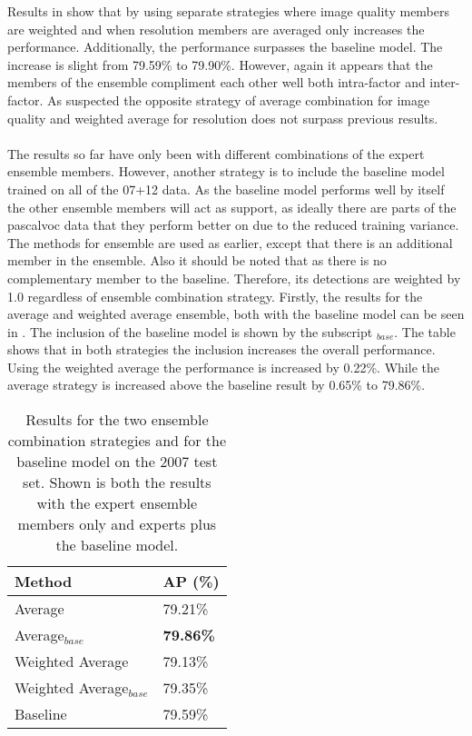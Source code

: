 \documentclass[a4paper,twoside]{article}
\begin{document}
Results in  show that by using separate strategies where image quality members are weighted and when resolution members are averaged only increases the performance. Additionally, the performance surpasses the baseline model. The increase is slight from 79.59\% to 79.90\%. However, again it appears that the members of the ensemble compliment each other well both intra-factor and inter-factor. As suspected the opposite strategy of average combination for image quality and weighted average for resolution does not surpass previous results. 
\\\\
The results so far have only been with different combinations of the expert ensemble members. However, another strategy is to include the baseline model trained on all of the 07+12 data. As the baseline model performs well by itself the other ensemble members will act as support, as ideally there are parts of the \gls{pascalvoc} data that they perform better on due to the reduced training variance. The methods for ensemble are used as earlier, except that there is an additional member in the ensemble. Also it should be noted that as there is no complementary member to the baseline. Therefore, its detections are weighted by 1.0 regardless of ensemble combination strategy. Firstly, the results for the average and weighted average ensemble, both with the baseline model can be seen in . The inclusion of the baseline model is shown by the subscript $_{base}$. The table shows that in both strategies the inclusion increases the overall performance. Using the weighted average the performance is increased by 0.22\%. While the average strategy is increased above the baseline result by 0.65\% to 79.86\%.

\begin{table}[h]
\centering
\caption{Results for the two ensemble combination strategies and for the baseline model on the 2007 test set. Shown is both the results with the expert ensemble members only and experts plus the baseline model.}
\label{tab:ensemble_base}
\begin{tabular}{|l|l|}
\hline
\textbf{Method}           & \textbf{AP (\%)} \\ \hline
Average          & 79.21\% \\ \hline
Average$_{base}$          & \textbf{79.86\%} \\ \hline
Weighted Average & 79.13\% \\ \hline
Weighted Average$_{base}$ & 79.35\% \\ \hline
Baseline         & 79.59\% \\ \hline
\end{tabular}
\end{table}
\end{document}
